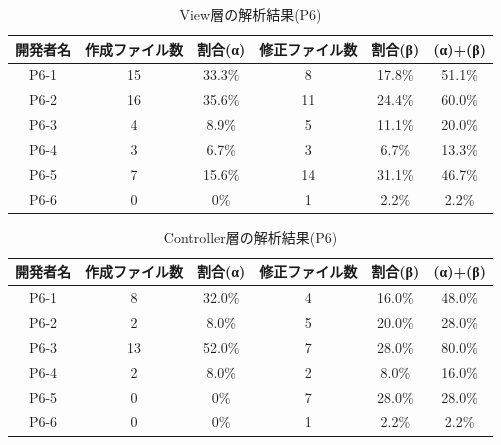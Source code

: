 \documentclass{funthesis}
\begin{document}
\begin{table}[H]
  \begin{center}
\begin{tabular}{|c|c|c|c|c||c|}\hline
開発者名&作成ファイル数&割合(α)&修正ファイル数&割合(β)&(α)+(β)\\ \hline
P6-1 & 15 & 33.3\% & 8 & 17.8\% & 51.1\%\\ \hline \hline
P6-2 & 16 & 35.6\% & 11 & 24.4\% & 60.0\%\\ \hline \hline
P6-3 & 4 & 8.9\% & 5 & 11.1\% & 20.0\%\\ \hline \hline
P6-4 & 3 & 6.7\% & 3 & 6.7\% & 13.3\%\\ \hline \hline
P6-5 & 7 & 15.6\% & 14 & 31.1\% & 46.7\%\\ \hline \hline
P6-6 & 0 & 0\% & 1 & 2.2\% & 2.2\%\\ \hline 
\end{tabular}    
\caption{View層の解析結果(P6)}    \label{sample}
  \end{center}
\end{table}\begin{table}[H]
  \begin{center}
\begin{tabular}{|c|c|c|c|c||c|}\hline
開発者名&作成ファイル数&割合(α)&修正ファイル数&割合(β)&(α)+(β)\\ \hline
P6-1 & 8 & 32.0\% & 4 & 16.0\% & 48.0\%\\ \hline \hline
P6-2 & 2 & 8.0\% & 5 & 20.0\% & 28.0\%\\ \hline \hline
P6-3 & 13 & 52.0\% & 7 & 28.0\% & 80.0\%\\ \hline \hline
P6-4 & 2 & 8.0\% & 2 & 8.0\% & 16.0\%\\ \hline \hline
P6-5 & 0 & 0\% & 7 & 28.0\% & 28.0\%\\ \hline \hline
P6-6 & 0 & 0\% & 1 & 2.2\% & 2.2\%\\ \hline 
\end{tabular}    
\caption{Controller層の解析結果(P6)}    \label{sample}
  \end{center}
\end{table}
\end{document}
